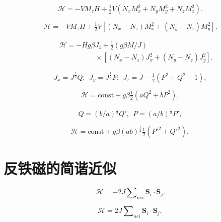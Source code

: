 \documentclass{article}
\begin{document}
\begin{equation} \label{eq:70}
\mathcal{H}=-VM_zH+\tfrac{1}{2}V(N_xM_x^2+N_yM_y^2+N_zM_z^2).
\end{equation}

\begin{equation} \label{eq:71}
\mathcal{H}=-VM_zH+\tfrac{1}{2}V[(N_x-N_z)M_x^2+(N_y-N_z)M_y^2].
\end{equation}

\begin{eqnarray} \label{eq:72}
&&\mathcal{H}=-Hg\beta J_z+\tfrac{1}{2}(g\beta M/J)\nonumber\\
&&\phantom{~~~~~~~~~~~~~~~~~~~~~~~}\times[(N_x-N_z)J_x^2+(N_y-N_z)J_y^2].
\end{eqnarray}

\begin{equation} \label{eq:73}
J_x=J^{\frac{1}{2}}Q;~~J_y=J^{\frac{1}{2}}P;~~J_z=J-\tfrac{1}{2}(P^2+Q^2-1),
\end{equation}

\begin{equation} \label{eq:74}
\mathcal{H}=\text{const}+g\beta\tfrac{1}{2}(aQ^2+bP^2),
\end{equation}

\begin{equation} \label{eq:75}
Q=(b/a)^{\frac{1}{2}}Q',~~P=(a/b)^{\frac{1}{2}}P',
\end{equation}

\begin{equation} \label{eq:76}
\mathcal{H}=\text{const}+g\beta(ab)^{\frac{1}{2}}\tfrac{1}{2}(P'^2+Q'^2),
\end{equation} 



\section{反铁磁的简谐近似} \label{sec:7}

\begin{equation} \label{eq:77}
\mathcal{H}=-2J\sum\nolimits_{\textit{nei}}\mathbf{S}_i\cdot\mathbf{S}_j.
\end{equation} 

\begin{equation} \label{eq:78}
\mathcal{H}=2J\sum\nolimits_{\mathit{nei}}\mathbf{S}_i\cdot\mathbf{S}_j,
\end{equation}
\end{document}
